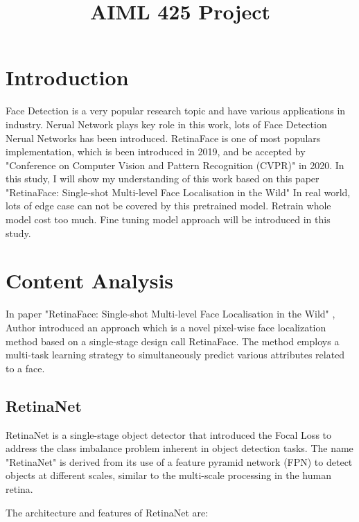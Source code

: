 \documentclass{article}
\title{AIML 425 Project}
\begin{document}
%
\maketitle
%
\section{Introduction}
\label{sec:intro}

Face Detection is a very popular research topic and have various applications in industry.
Nerual Network plays key role in this work, lots of Face Detection Nerual Networks has been introduced.
RetinaFace is one of most populars implementation, which is been introduced in 2019, 
and be accepted by "Conference on Computer Vision and Pattern Recognition (CVPR)" in 2020.
In this study, I will show my understanding of this work based on this paper "RetinaFace: Single-shot Multi-level Face Localisation in the Wild" \cite{deng2020retinaface}
In real world, lots of edge case can not be covered by this pretrained model.
Retrain whole model cost too much.
Fine tuning model approach will be introduced in this study.


\section{Content Analysis}
\label{sec:content}

In paper "RetinaFace: Single-shot Multi-level Face Localisation in the Wild" \cite{deng2020retinaface}, 
Author introduced an approach which is a  novel pixel-wise face localization method based on a single-stage design call RetinaFace. 
The method employs a multi-task learning strategy to simultaneously predict various attributes related to a face. 

\subsection{RetinaNet}

RetinaNet is a single-stage object detector that introduced the Focal Loss to address the class imbalance problem inherent in object detection tasks. The name "RetinaNet" is derived from its use of a feature pyramid network (FPN) to detect objects at different scales, similar to the multi-scale processing in the human retina.

The architecture and features of RetinaNet are:
\end{document}
